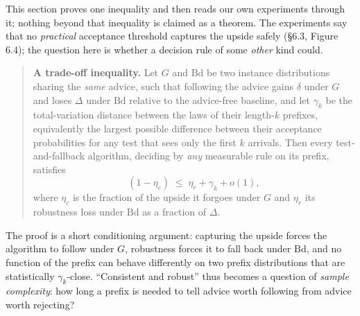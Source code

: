 This section proves one inequality and then reads our own experiments
through it; nothing beyond that inequality is claimed as a theorem. The
experiments say that no \emph{practical} acceptance threshold captures
the upside safely (§6.3, Figure 6.4); the question here is whether a
decision rule of some \emph{other} kind could.

\begin{quote}
\textbf{A trade-off inequality.} Let \(G\) and \(\mathrm{Bd}\) be two
instance distributions sharing the \emph{same} advice, such that
following the advice gains \(\delta\) under \(G\) and loses \(\Delta\)
under \(\mathrm{Bd}\) relative to the advice-free baseline, and let
\(\gamma_k\) be the total-variation distance between the laws of their
length-\(k\) prefixes, equivalently the largest possible difference
between their acceptance probabilities for any test that sees only the
first \(k\) arrivals. Then every test-and-fallback algorithm, deciding
by \emph{any} measurable rule on its prefix, satisfies
\[(1-\eta_c)\;\le\;\eta_r+\gamma_k+o(1),\] where \(\eta_c\) is the
fraction of the upside it forgoes under \(G\) and \(\eta_r\) its
robustness loss under \(\mathrm{Bd}\) as a fraction of \(\Delta\).
\end{quote}

The proof is a short conditioning argument: capturing the upside forces
the algorithm to follow under \(G\), robustness forces it to fall back
under \(\mathrm{Bd}\), and no function of the prefix can behave
differently on two prefix distributions that are statistically
\(\gamma_k\)-close. ``Consistent and robust'' thus becomes a question of
\emph{sample complexity}: how long a prefix is needed to tell advice
worth following from advice worth rejecting?

